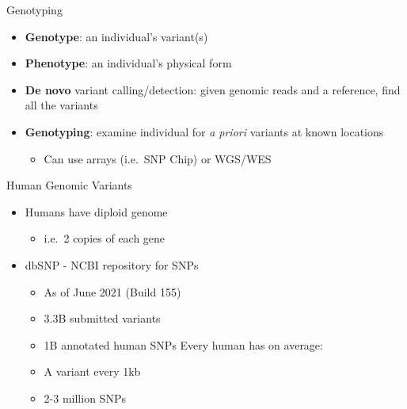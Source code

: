 \documentclass[
  ignorenonframetext,
]{beamer}
\providecommand{\tightlist}{%
  \setlength{\itemsep}{0pt}\setlength{\parskip}{0pt}}
\begin{document}
\begin{frame}{Genotyping}
\label{genotyping}
\Large

\begin{itemize}
\tightlist
\item
  \textbf{Genotype}: an individual's variant(s)
\item
  \textbf{Phenotype}: an individual's physical form
\item
  \textbf{De novo} variant calling/detection: given genomic reads and a
  reference, find all the variants
\item
  \textbf{Genotyping}: examine individual for \emph{a priori} variants
  at known locations

  \begin{itemize}
  \tightlist
  \item
    Can use arrays (i.e.~SNP Chip) or WGS/WES
  \end{itemize}
\end{itemize}
\end{frame}

\begin{frame}{Human Genomic Variants}
\label{human-genomic-variants}
\Large

\begin{itemize}
\tightlist
\item
  Humans have diploid genome

  \begin{itemize}
  \tightlist
  \item
    i.e.~2 copies of each gene
  \end{itemize}
\item
  dbSNP - NCBI repository for SNPs

  \begin{itemize}
  \tightlist
  \item
    As of June 2021 (Build 155)
  \item
    3.3B submitted variants
  \item
    1B annotated human SNPs Every human has on average:
  \item
    A variant every 1kb
  \item
    2-3 million SNPs
  \end{itemize}
\end{itemize}
\end{frame}
\end{document}

